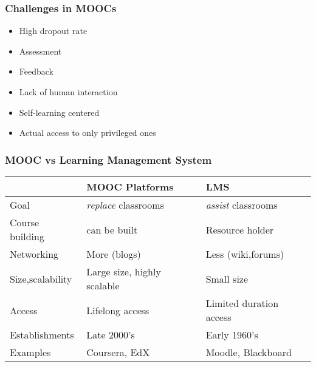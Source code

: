 \documentclass[13pt]{beamer}
\begin{document}
\begin{frame}
	\frametitle{Challenges in MOOCs}
	    \begin{itemize}
	     \item High dropout rate
	     \item Assessment
	     \item Feedback
	     \item Lack of human interaction
	     \item Self-learning centered
	     \item Actual access to only privileged ones
	    \end{itemize}

\end{frame}


\begin{frame}
    \frametitle{MOOC vs Learning Management System}
    \begin{table}[ht]
    \begin{tabular}{|l|l|l|}
        \hline
        ~                & \textbf{MOOC Platforms}                & \textbf{LMS}                          \\ \hline \hline
        Goal             & \textit{replace} classrooms 	 & \textit{assist} classrooms \\ \hline
        Course building  & can be built   		 & Resource holder  \\ \hline
        Networking       & More (blogs)    	         & Less (wiki,forums)  \\ \hline
        Size,scalability & Large size, highly scalable   & Small size                   \\ \hline
        Access           & Lifelong access               & Limited duration access      \\ \hline
        Establishments   & Late 2000's                   & Early 1960's                 \\ \hline
        Examples         & Coursera, EdX                 & Moodle, Blackboard           \\
        \hline
    \end{tabular}
    \label{tab:moocvslms}
\end{table}

\end{frame}
\end{document}
